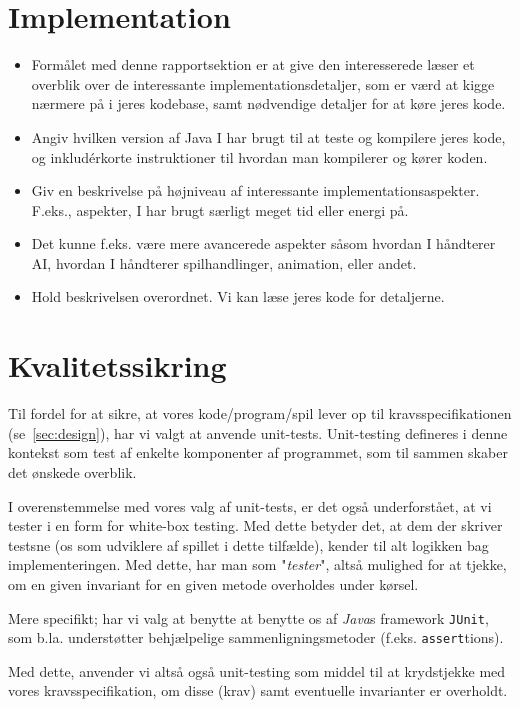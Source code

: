 \documentclass{article}
\newcommand{\code}[1]{\small\texttt{#1}}
\theoremstyle{mytheoremstyle}
\theoremstyle{mytheoremstyle}
\theoremstyle{myproblemstyle}
\begin{document}
\section{Implementation}\label{sec:Implementation} %
\begin{itemize}
  \item Formålet med denne rapportsektion er at give den interesserede læser et
  overblik over de interessante implementationsdetaljer, som er værd at kigge
  nærmere på i jeres kodebase, samt nødvendige detaljer for at køre jeres kode.
  \item Angiv hvilken version af Java I har brugt til at teste og kompilere
  jeres kode, og inkludérkorte instruktioner til hvordan man kompilerer og kører
  koden.
  \item Giv en beskrivelse på højniveau af interessante implementationsaspekter.
  F.eks., aspekter, I har brugt særligt meget tid eller energi på.
  \item Det kunne f.eks. være mere avancerede aspekter såsom hvordan I håndterer
  AI, hvordan I håndterer spilhandlinger, animation, eller andet.
  \item Hold beskrivelsen overordnet. Vi kan læse jeres kode for detaljerne.
\end{itemize}

\section{Kvalitetssikring}\label{sec:Kvalitetssikring} %
Til fordel for at sikre, at vores kode/program/spil lever op til kravsspecifikationen (se \autoref{sec:design}), har vi valgt at anvende unit-tests. Unit-testing defineres i denne kontekst som test af enkelte komponenter af programmet, som til sammen skaber det ønskede overblik.

I overenstemmelse med vores valg af unit-tests, er det også underforstået, at vi tester i en form for white-box testing. Med dette betyder det, at dem der skriver testsne (os som udviklere af spillet i dette tilfælde), kender til alt logikken bag implementeringen. Med dette, har man som "\textit{tester}", altså mulighed for at tjekke, om en given invariant for en given metode overholdes under kørsel.

Mere specifikt; har vi valg at benytte at benytte os af \textit{Java}s framework \code{JUnit}, som b.la. understøtter behjælpelige sammenligningsmetoder (f.eks. \code{assert}tions).

Med dette, anvender vi altså også unit-testing som middel til at krydstjekke med vores kravsspecifikation, om disse (krav) samt eventuelle invarianter er overholdt.
\end{document}
